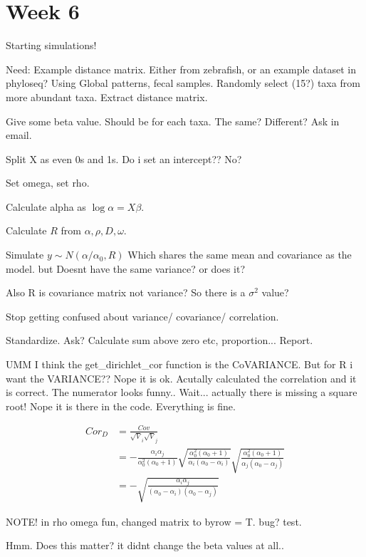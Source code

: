 \documentclass[10pt]{article}
\theoremstyle{definition}
\begin{document}
\newpage
\section{Week 6}


Starting simulations!

Need: Example distance matrix. Either from zebrafish, or an example dataset in phyloseq?
Using Global patterns, fecal samples. Randomly select (15?) taxa from more abundant taxa. Extract distance matrix.

Give some beta value. Should be for each taxa. The same? Different? Ask in email.

Split X as even 0s and 1s.
Do i set an intercept?? No?

Set omega, set rho.

Calculate alpha as $\log \alpha = X \beta$.

Calculate $R$ from $\alpha, \rho, D, \omega$.

Simulate $y \sim N(\alpha/\alpha_0, R)$
Which shares the same mean and covariance as the model.
but Doesnt have the same variance? or does it?

Also R is covariance matrix not variance? So there is a $\sigma^2$ value?

Stop getting confused about variance/ covariance/ correlation.

Standardize. Ask? Calculate sum above zero etc, proportion...
Report.

UMM I think the get\_dirichlet\_cor function is the CoVARIANCE. But for R i want the VARIANCE?? Nope it is ok. Acutally calculated the correlation and it is correct. The numerator looks funny.. Wait... actually there is missing a square root! Nope it is there in the code. Everything is fine.

\begin{align*}
  Cor_D &= \frac{Cov}{\sqrt V_i \sqrt V_j}\\
  &= -\frac{\alpha_i\alpha_j}{\alpha_0^2 (\alpha_0 + 1)} \sqrt{\frac{\alpha_0^2 (\alpha_0 + 1)}{\alpha_i(\alpha_0 - \alpha_i)}} \sqrt{\frac{\alpha_0^2 (\alpha_0 + 1)}{\alpha_j(\alpha_0 - \alpha_j)}}\\
  &= - \sqrt{\frac{\alpha_i \alpha_j}{(\alpha_0 - \alpha_i)(\alpha_0 - \alpha_j )}}
\end{align*}

NOTE! in rho omega fun, changed matrix to byrow = T. bug? test.

Hmm. Does this matter? it didnt change the beta values at all..
\end{document}
